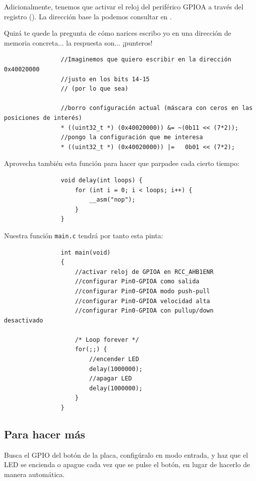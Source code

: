 \documentclass[../main.tex]{subfiles}
\begin{document}
            Adicionalmente, tenemos que activar el reloj del periférico GPIOA a través del registro  (\REFMAN[5.3.10]). La dirección base la podemos consultar en \REFMAN[1.6.2].

            Quizá te quede la pregunta de cómo narices escribo yo en una dirección de memoria concreta... la respuesta son... ¡punteros!

            \begin{lstlisting}
                //Imaginemos que quiero escribir en la dirección 0x40020000
                //justo en los bits 14-15
                // (por lo que sea)
                
                //borro configuración actual (máscara con ceros en las posiciones de interés)
                * ((uint32_t *) (0x40020000)) &= ~(0b11 << (7*2));
                //pongo la configuración que me interesa
                * ((uint32_t *) (0x40020000)) |=   0b01 << (7*2);
            \end{lstlisting}
            
            Aprovecha también esta función para hacer que parpadee cada cierto tiempo:

            \begin{lstlisting}
                void delay(int loops) {
                    for (int i = 0; i < loops; i++) {
                        __asm("nop");
                    }
                }
            \end{lstlisting}

            Nuestra función \lstinline|main.c| tendrá por tanto esta pinta:

            \begin{lstlisting}
                int main(void)
                {
                    //activar reloj de GPIOA en RCC_AHB1ENR
                    //configurar Pin0-GPIOA como salida
                    //configurar Pin0-GPIOA modo push-pull
                    //configurar Pin0-GPIOA velocidad alta
                    //configurar Pin0-GPIOA con pullup/down desactivado

                    /* Loop forever */
                    for(;;) {
                        //encender LED
                        delay(1000000);
                        //apagar LED
                        delay(1000000);
                    }
                }
            \end{lstlisting}

    \subsection{Para hacer más}

        Busca el GPIO del botón de la placa, configúralo en modo entrada, y haz que el LED se encienda o apague cada vez que se pulse el botón, en lugar de hacerlo de manera automática.
\end{document}
